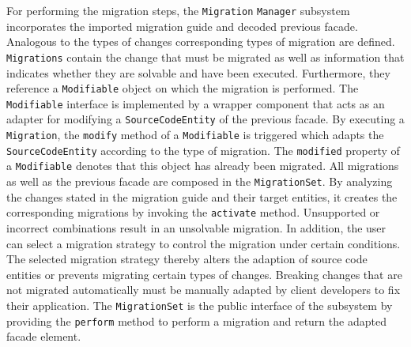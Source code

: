 For performing the migration steps, the \texttt{Migration} \texttt{Manager} subsystem incorporates the imported migration guide and decoded previous facade. Analogous to the types of changes corresponding types of migration are defined. \texttt{Migrations} contain the change that must be migrated as well as information that indicates whether they are solvable and have been executed. Furthermore, they reference a \texttt{Modifiable} object on which the migration is performed. The \texttt{Modifiable} interface is implemented by a wrapper component that acts as an adapter for modifying a \texttt{SourceCodeEntity} of the previous facade. By executing a \texttt{Migration}, the \texttt{modify} method of a \texttt{Modifiable} is triggered which adapts the \texttt{SourceCodeEntity} according to the type of migration. The \texttt{mo\-di\-fied} property of a \texttt{Modifiable} denotes that this object has already been migrated. All migrations as well as the previous facade are composed in the \texttt{MigrationSet}. By analyzing the changes stated in the migration guide and their target entities, it creates the corresponding migrations by invoking the \texttt{ac\-ti\-vate} method. Unsupported or incorrect combinations result in an unsolvable migration. In addition, the user can select a migration strategy to control the migration under certain conditions. The selected migration strategy thereby alters the adaption of source code entities or prevents migrating certain types of changes. Breaking changes that are not migrated automatically must be manually adapted by client developers to fix their application. The \texttt{MigrationSet} is the public interface of the subsystem by providing the \texttt{perform} method to perform a migration and return the adapted facade element.

\begin{figure}[!h]
\end{figure}

